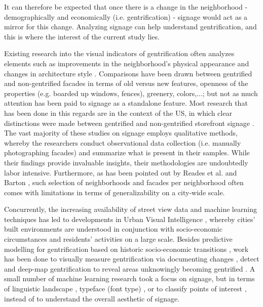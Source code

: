 It can therefore be expected that once there is a change in the neighborhood - demographically and economically (i.e. gentrification) - signage would act as a mirror for this change. Analyzing signage can help understand gentrification, and this is where the interest of the current study lies.

Existing research into the visual indicators of gentrification often analyzes elements such as improvements in the neighborhood's physical appearance and changes in architecture style \cite{huang_detecting_2022, ravuri_gsv_2022, naik_computer_2017, ilic_deepmap_2019}. Comparisons have been drawn between gentrified and non-gentrified facades in terms of old versus new features, openness of the properties (e.g. boarded up windows, fences), greenery, colors,...; but not as much attention has been paid to signage as a standalone feature. Most research that has been done in this regards are in the context of the US, in which clear distinctions were made between gentrified and non-gentrified storefront signage \cite{trinch_signsays_2017, snajdr_oldschool_2018, snajdr_preserve_2022, rahman_signage_2020}. The vast majority of these studies on signage employs qualitative methods, whereby the researchers conduct observational data collection (i.e. manually photographing facades) and summarize what is present in their samples. While their findings provide invaluable insights, their methodologies are undoubtedly labor intensive. Furthermore, as has been pointed out by Reades et al. \cite{reades_understanding_2019} and Barton \cite{barton_exploration_2016}, such selection of neighborhoods and facades per neighborhood often comes with limitations in terms of generalizability on a city-wide scale.

Concurrently, the increasing availability of street view data and machine learning techniques has led to developments in Urban Visual Intelligence \cite{zhanga_urban_2023}, whereby cities' built environments are understood in conjunction with socio-economic circumstances and residents' activities on a large scale. Besides predictive modelling for gentrification based on historic socio-economic transitions \cite{thackway_build_2021, reades_understanding_2019}, work has been done to visually measure gentrification via documenting changes \cite{ravuri_gsv_2022}, detect \cite{huang_detecting_2022} and deep-map gentrification to reveal areas unknowingly becoming gentrified \cite{ilic_deepmap_2019}. A small number of machine learning research took a focus on signage, but in terms of linguistic landscape \cite{hong_linguistic_2020, thung_detecting_2022}, typeface (font type) \cite{ma_typef_2019}, or to classify points of interest \cite{noorian_detect_2020, bakaev_stsem_2019}, instead of to understand the overall aesthetic of signage.

